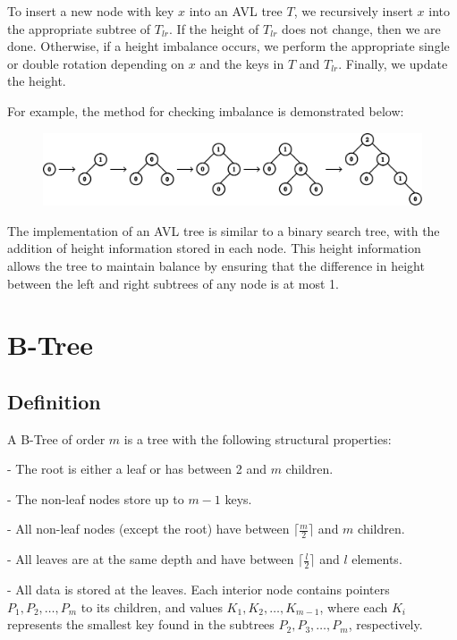 To insert a new node with key \(x\) into an AVL tree \(T\), we recursively insert \(x\) into the appropriate subtree of \(T_{lr}\). If the height of \(T_{lr}\) does not change, then we are done. Otherwise, if a height imbalance occurs, we perform the appropriate single or double rotation depending on \(x\) and the keys in \(T\) and \(T_{lr}\). Finally, we update the height.

For example, the method for checking imbalance is demonstrated below:
\begin{figure}[H]
  \centering
  \includegraphics[width=\textwidth]{Figure/AVLInDemo.pdf}
\end{figure}

The implementation of an AVL tree is similar to a binary search tree, with the addition of height information stored in each node. This height information allows the tree to maintain balance by ensuring that the difference in height between the left and right subtrees of any node is at most 1.

\section{B-Tree}
\subsection{Definition}
A B-Tree of order \(m\) is a tree with the following structural properties:  

- The root is either a leaf or has between 2 and \(m\) children.  

- The non-leaf nodes store up to \(m - 1\) keys.  

- All non-leaf nodes (except the root) have between \(\lceil \frac{m}{2} \rceil\) and \(m\) children.  

- All leaves are at the same depth and have between \(\lceil \frac{l}{2} \rceil\) and \(l\) elements.  

- All data is stored at the leaves. Each interior node contains pointers \(P_1, P_2, \dots, P_m\) to its children, and values \(K_1, K_2, \dots, K_{m-1}\), where each \(K_i\) represents the smallest key found in the subtrees \(P_2, P_3, \dots, P_m\), respectively.  

